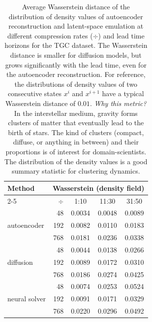 \begin{subappendices}
\begin{table}[h]
    \centering
    \caption{Average Wasserstein distance of the distribution of density values of autoencoder reconstruction and latent-space emulation at different compression rates ($\div$) and lead time horizons for the TGC dataset. The Wasserstein distance is smaller for diffusion models, but grows significantly with the lead time, even for the autoencoder reconstruction. For reference, the distributions of density values of two consecutive states $x^i$ and $x^{i+1}$ have a typical Wasserstein distance of $0.01$. \emph{Why this metric?} In the interstellar medium, gravity forms clusters of matter that eventually lead to the birth of stars. The kind of clusters (compact, diffuse, or anything in between) and their proportions is of interest for domain-scientists. The distribution of the density values is a good summary statistic for clustering dynamics.}
    \footnotesize
    \begin{tabular}{lrccc}
        \toprule
        \multirow[c]{2}{*}{Method} & \multicolumn{4}{c}{Wasserstein (density field)} \\
        \cmidrule(lr){2-5}
         & $\div$ & 1:10 & 11:30 & 31:50 \\
        \midrule
        \multirow[c]{3}{*}{autoencoder}
        & 48  & 0.0034 & 0.0048 & 0.0089 \\
        & 192 & 0.0082 & 0.0110 & 0.0183 \\
        & 768 & 0.0181 & 0.0236 & 0.0338 \\
        \midrule
        \multirow[c]{3}{*}{diffusion}
        & 48  & 0.0044 & 0.0138 & 0.0266 \\
        & 192 & 0.0089 & 0.0172 & 0.0310 \\
        & 768 & 0.0186 & 0.0274 & 0.0425 \\
        \midrule
        \multirow[c]{3}{*}{neural solver}
        & 48  & 0.0074 & 0.0253 & 0.0524 \\
        & 192 & 0.0091 & 0.0171 & 0.0329 \\
        & 768 & 0.0220 & 0.0296 & 0.0492 \\
        \bottomrule
    \end{tabular}
    \label{tab:wasserstein-tgc-vs-compression}
\end{table}


\end{subappendices}
